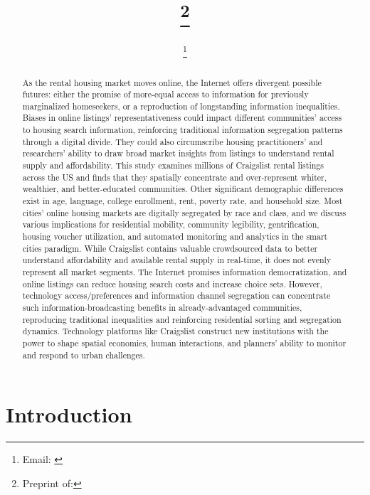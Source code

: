\documentclass[11pt,letterpaper]{article}
\begin{document}
\title{\papertitle\footnote{{Preprint of: \papercitation}}}
\author[]{\myname\footnote{Email: \href{mailto:\myemail}{\myemail}}}
\affil[]{\myaffiliation}
\date{}%

\maketitle

\begin{abstract}
As the rental housing market moves online, the Internet offers divergent possible futures: either the promise of more-equal access to information for previously marginalized homeseekers, or a reproduction of longstanding information inequalities. Biases in online listings' representativeness could impact different communities' access to housing search information, reinforcing traditional information segregation patterns through a digital divide. They could also circumscribe housing practitioners' and researchers' ability to draw broad market insights from listings to understand rental supply and affordability. This study examines millions of Craigslist rental listings across the US and finds that they spatially concentrate and over-represent whiter, wealthier, and better-educated communities. Other significant demographic differences exist in age, language, college enrollment, rent, poverty rate, and household size. Most cities' online housing markets are digitally segregated by race and class, and we discuss various implications for residential mobility, community legibility, gentrification, housing voucher utilization, and automated monitoring and analytics in the smart cities paradigm. While Craigslist contains valuable crowdsourced data to better understand affordability and available rental supply in real-time, it does not evenly represent all market segments. The Internet promises information democratization, and online listings can reduce housing search costs and increase choice sets. However, technology access/preferences and information channel segregation can concentrate such information-broadcasting benefits  in already-advantaged communities, reproducing traditional inequalities and reinforcing residential sorting and segregation dynamics. Technology platforms like Craigslist construct new institutions with the power to shape spatial economies, human interactions, and planners' ability to monitor and respond to urban challenges.
\vfill
\end{abstract}


\section{Introduction}
\end{document}
